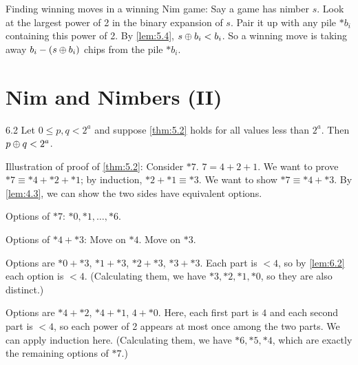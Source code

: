\documentclass[12pt,letterpaper]{report}
\begin{document}
Finding winning moves in a winning Nim game: Say a game has nimber $s$.
Look at the largest power of 2 in the binary expansion of $s$.
Pair it up with any pile $*b_i$ containing this power of 2.
By \cref{lem:5.4}, $s \oplus b_i < b_i$.
So a winning move is taking away $b_i - (s \oplus b_i)$ chips from the pile $*b_i$.

\section{Nim and Nimbers (II)}

\begin{lem}[code={\setcounter{\tcbcounter}{1}}]{}{6.2}
  Let $0 \leq p, q < 2^a$ and suppose \cref{thm:5.2} holds for all values less than $2^a$.
  Then $p \oplus q < 2^a$.
\end{lem}

\begin{thmproof}

\end{thmproof}

Illustration of proof of \cref{thm:5.2}: Consider $*7$.
$7 = 4 + 2 + 1$.
We want to prove $*7 \equiv *4 + *2 + *1$; by induction, $*2 + *1 \equiv *3$.
We want to show $*7 \equiv *4 + *3$.
By \cref{lem:4.3}, we can show the two sides have equivalent options.

Options of $*7$: $*0, *1, \ldots, *6$.

Options of $*4 + *3$:  Move on $*4$. \quad {} Move on $*3$.

\begin{enumcase}
  \item
    Options are $*0 + *3$, $*1 + *3$, $*2 + *3$, $*3 + *3$.
    Each part is $< 4$, so by \cref{lem:6.2} each option is $< 4$.
    (Calculating them, we have $*3, *2, *1, *0$, so they are also distinct.)
  \item
    Options are $*4 + *2$, $*4 + *1$, $4 + *0$.
    Here, each first part is $4$ and each second part is $< 4$, so each power of 2 appears at most
    once among the two parts.
    We can apply induction here.
    (Calculating them, we have $*6, *5, *4$, which are exactly the remaining options of $*7$.)
\end{enumcase}
\end{document}
